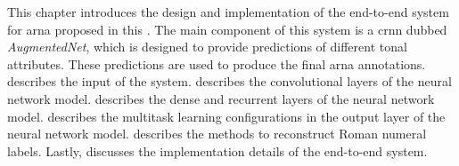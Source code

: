 

This chapter introduces the design and implementation of the
end-to-end system for \gls{arna} proposed in this
\thesisdiss{}. The main component of this system is a
\gls{crnn} dubbed \emph{AugmentedNet}, which is designed to
provide predictions of different tonal attributes. These
predictions are used to produce the final \gls{arna}
annotations.  describes the input of the
system.  describes the
convolutional layers of the neural network model.
 describes the dense and
recurrent layers of the neural network model.
 describes the
multitask learning configurations in the output layer of the
neural network model. 
describes the methods to reconstruct Roman numeral labels.
Lastly,  discusses the implementation
details of the end-to-end system.

